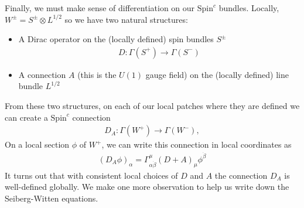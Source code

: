 \documentclass[12pt, onecolumn]{article}
\begin{document}
\noindent Finally, we must make sense of differentiation on our $\text{Spin}^{c}$ bundles.  Locally, $W^{\pm}=S^{\pm} \otimes L^{1/2}$ so we have two natural structures:
\begin{itemize}
\item A Dirac operator on the (locally defined) spin bundles $S^{\pm}$
\begin{align*}
D: \Gamma(S^{+}) \rightarrow \Gamma(S^{-})
\end{align*}
\item A connection $A$ (this is the $U(1)$ gauge field) on the (locally defined) line bundle $L^{1/2}$ 
\end{itemize}
From these two structures, on each of our local patches where they are defined we can create a $\text{Spin}^{c}$ connection
\begin{align*}
D_{A}: \Gamma(W^{+}) \rightarrow \Gamma(W^{-}),
\end{align*}
On a local section $\phi$ of $W^{+}$, we can write this connection in local coordinates as
\begin{align*}
(D_{A} \phi)_{\alpha} =\Gamma^{\mu}_{\alpha \dot{\beta}}(D+A)_{\mu}\phi^{\dot{\beta}}
\end{align*}
It turns out that with consistent local choices of $D$ and $A$ the connection $D_{A}$ is well-defined globally.  We make one more observation to help us write down the Seiberg-Witten equations.
\end{document}
